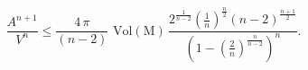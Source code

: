\begin{equation}
\frac{A^{n+1}}{V^n} \le
\frac{4\,\pi}{(n-2)}\,\,\mathrm{Vol(M)}\,\frac{2^{\frac{1}{n-2}}(\frac{1}{n})^{\frac{n}{2}}(n-2)^{\frac{n+1}{2}}}{\left(1-(\frac{2}{n})^{\frac{n}{n-2}}
\right)^n}. \label{Schineqn1}
\end{equation}

